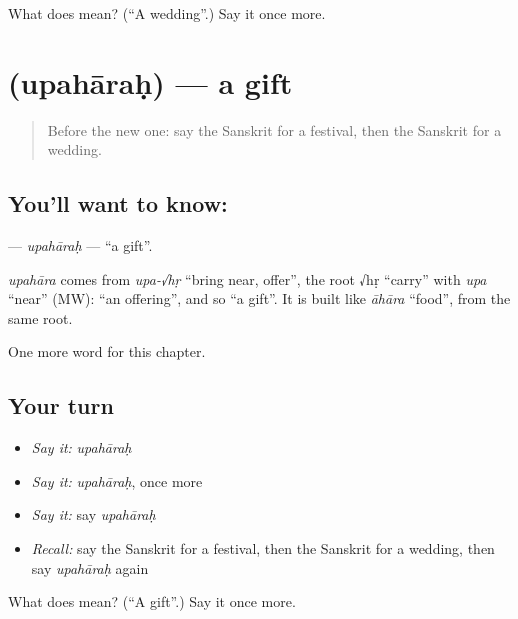 \begin{tcolorbox}[breakable,colback=teal!4,colframe=teal!35!black,title={Before you move on}]
What does  mean? (\textquotedblleft{}A wedding\textquotedblright{}.) Say it once more.
\end{tcolorbox}
\section[\texorpdfstring{\sk{उपहारः} (upahāraḥ)}{उपहारः (upahāraḥ)}]{ (upahāraḥ) — a gift}

\label{lesson:SA-C163-upaharah}



\begin{quote}
Before the new one: say the Sanskrit for a festival, then the Sanskrit for a wedding.
\end{quote}

\subsection*{You'll want to know: }
\textbf{} — \emph{upahāraḥ} — \textquotedblleft{}a gift\textquotedblright{}.

\begin{cousinweb}
\emph{upahāra} comes from \emph{upa-√hṛ} \textquotedblleft{}bring near, offer\textquotedblright{}, the root √hṛ \textquotedblleft{}carry\textquotedblright{} with \emph{upa} \textquotedblleft{}near\textquotedblright{} (MW): \textquotedblleft{}an offering\textquotedblright{}, and so \textquotedblleft{}a gift\textquotedblright{}. It is built like \emph{āhāra} \textquotedblleft{}food\textquotedblright{}, from the same root.
\end{cousinweb}

\begin{grammarlens}[title={What you've built}]
One more word for this chapter.
\end{grammarlens}

\subsection*{Your turn}
\begin{itemize}
\raggedright
  \item \emph{Say it:} \emph{upahāraḥ}
  \item \emph{Say it:} \emph{upahāraḥ}, once more
  \item \emph{Say it:} say \emph{upahāraḥ}
  \item \emph{Recall:} say the Sanskrit for a festival, then the Sanskrit for a wedding, then say \emph{upahāraḥ} again
\end{itemize}

\begin{tcolorbox}[breakable,colback=teal!4,colframe=teal!35!black,title={Before you move on}]
What does  mean? (\textquotedblleft{}A gift\textquotedblright{}.) Say it once more.
\end{tcolorbox}
